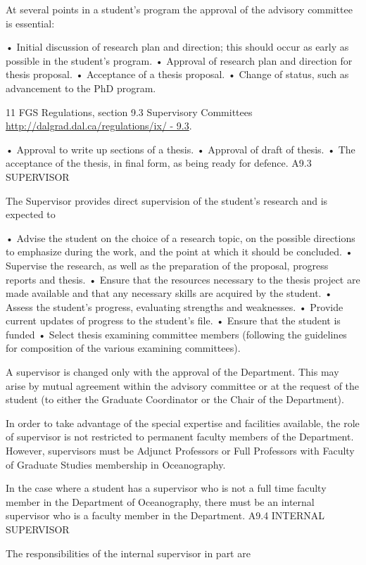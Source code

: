 \documentclass{article}
\newcommand\elink[1]{\url{#1}}
\begin{document}
At several points in a student's program the approval of the advisory committee is essential:

•	Initial discussion of research plan and direction; this should occur as early as possible in the student's program.
•	Approval of research plan and direction for thesis proposal.
•	Acceptance of a thesis proposal.
•	Change of status, such as advancement to the PhD program.

11 FGS Regulations, section 9.3 Supervisory Committees \elink{http://dalgrad.dal.ca/regulations/ix/ - 9.3}.
 

•	Approval to write up sections of a thesis.
•	Approval of draft of thesis.
•	The acceptance of the thesis, in final form, as being ready for defence.
A9.3	SUPERVISOR

The Supervisor provides direct supervision of the student's research and is expected to

•	Advise the student on the choice of a research topic, on the possible directions to emphasize during the work, and the point at which it should be concluded.
•	Supervise the research, as well as the preparation of the proposal, progress reports and thesis.
•	Ensure that the resources necessary to the thesis project are made available and that any necessary skills are acquired by the student.
•	Assess the student's progress, evaluating strengths and weaknesses.
•	Provide current updates of progress to the student's file.
•	Ensure that the student is funded
•	Select thesis examining committee members (following the guidelines for composition of the various examining committees).

A supervisor is changed only with the approval of the Department. This may arise by mutual agreement within the advisory committee or at the request of the student (to either the Graduate Coordinator or the Chair of the Department).

In order to take advantage of the special expertise and facilities available, the role of supervisor is not restricted to permanent faculty members of the Department. However, supervisors must be Adjunct Professors or Full Professors with Faculty of Graduate Studies membership in Oceanography.

In the case where a student has a supervisor who is not a full time faculty member in the Department of Oceanography, there must be an internal supervisor who is a faculty member in the Department.
A9.4	INTERNAL SUPERVISOR

The responsibilities of the internal supervisor in part are
\end{document}
